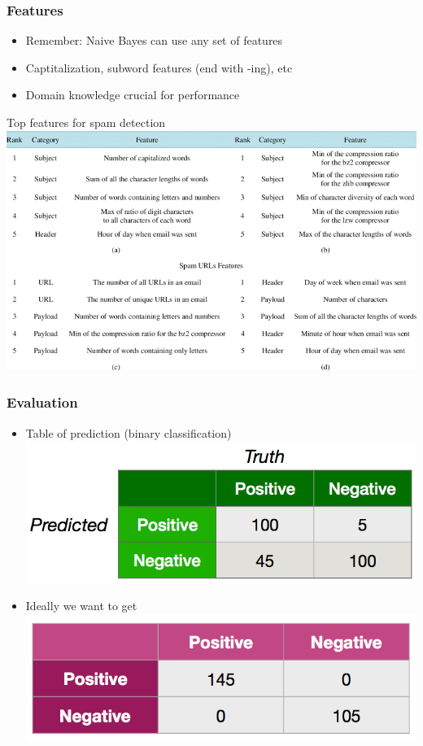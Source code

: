 \begin{frame}
\frametitle{Features}
\begin{itemize}[<+->]
\item Remember: Naive Bayes can use any set of features
\item Captitalization, subword features (end with -ing), etc
\item Domain knowledge crucial for performance
\end{itemize}

\pause
\begin{block}{Top features for spam detection}
\includegraphics[scale=0.25]{figures/classifiers/features.png}
\\
\end{block}
\end{frame}

\begin{frame}
\frametitle{Evaluation}
\begin{itemize}[<+->]
\item Table of prediction (binary classification)
\includegraphics[scale=0.25]{figures/classifiers/evalex1.png}
\item Ideally we want to get \\
\includegraphics[scale=0.25]{figures/classifiers/evalex0.png}
\end{itemize}
\end{frame}

